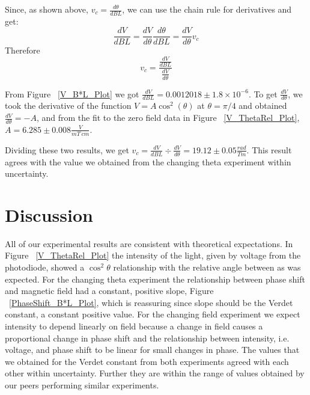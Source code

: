 \documentclass[prb,preprint]{revtex4-1}
\begin{document}
Since, as shown above, $v_c = \frac{d \theta}{dBL}$, we can use the chain rule for derivatives and get: 
\begin{equation}
\frac{ dV}{ dBL} = \frac{dV}{d\theta} \frac{d\theta}{dBL} = \frac{dV}{d\theta} v_c
\end{equation}
Therefore 
\begin{equation} 
v_c = \frac{\frac{dV}{dBL}}{\frac{dV}{d\theta}}
\end{equation}

From Figure ~\ref{V_B*L_Plot} we got $\frac{dV}{dBL} = 0.0012018 \pm 1.8 \times 10^{-6}$. To get $\frac{dV}{d\theta}$, we took the derivative of the function $V = A \cos^{2}(\theta)$ at $\theta = \pi/4$ and obtained $\frac{dV}{d\theta} = -A$, and from the fit to the zero field data in Figure ~\ref{V_ThetaRel_Plot}, $A = 6.285 \pm 0.008 \frac{V}{mT\ cm}$.  

Dividing these two results, we get $v_c = \frac{dV}{dBL} \div \frac{dV}{d\theta} = 19.12 \pm 0.05 \frac{rad}{Tm}$.  This result agrees with the value we obtained from the changing theta experiment within uncertainty.






\section{Discussion}

All of our experimental results are consistent with theoretical expectations. In Figure ~\ref{V_ThetaRel_Plot} the intensity of the light, given by voltage from the photodiode, showed a $\cos^2\theta$ relationship with the relative angle between as was expected. For the changing theta experiment the relationship between phase shift and magnetic field had a constant, positive slope, Figure ~\ref{PhaseShift_B*L_Plot}, which is reassuring since slope should be the Verdet constant, a constant positive value.  For the changing field experiment we expect intensity to depend linearly on field because a change in field causes a proportional change in phase shift and the relationship between intensity, i.e. voltage, and phase shift to be linear for small changes in phase. The values that we obtained for the Verdet constant from both experiments agreed with each other within uncertainty. Further they are within the range of values obtained by our peers performing similar experiments.
\end{document}
